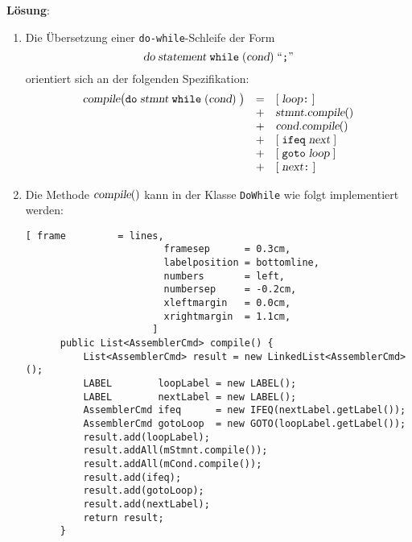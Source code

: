 \documentclass{article}
\newcommand{\solution}{
\vspace*{0.3cm}

\noindent
\textbf{L\"osung}: }
\newcommand{\quoted}[1]{\mbox{``\texttt{#1}''}}
\begin{document}
\solution
\begin{enumerate}
\item Die \"Ubersetzung einer \texttt{do-while}-Schleife der Form
      \[ \textsl{do}\; \textsl{statement}\; \texttt{while}\;(\textsl{cond})\; \quoted{;} \]
      orientiert sich an der folgenden Spezifikation:
      \[
      \begin{array}[t]{lcl}
        \textsl{compile}\bigl(\mathtt{do}\; \textsl{stmnt}\; \texttt{while}\; (\textsl{cond})\;\bigr) 
        & = & 
        [\;\textsl{loop}\texttt{:}\;]            \\
        & + & \textsl{stmnt}.\textsl{compile}()    \\    
        & + & \textsl{cond}.\textsl{compile}()         \\
        & + & [\;\texttt{ifeq}\;\textsl{next}\;] \\
        & + & [\;\texttt{goto}\;\textsl{loop}\;]    \\    
        & + & [\;\textsl{next}\texttt{:}\;]         
      \end{array}
      \]
\item Die Methode $\textsl{compile}()$ kann in der Klasse \texttt{DoWhile} wie folgt implementiert werden:
      \begin{Verbatim}[ frame         = lines, 
                        framesep      = 0.3cm, 
                        labelposition = bottomline,
                        numbers       = left,
                        numbersep     = -0.2cm,
                        xleftmargin   = 0.0cm,
                        xrightmargin  = 1.1cm,
                      ]
      public List<AssemblerCmd> compile() {
          List<AssemblerCmd> result = new LinkedList<AssemblerCmd>();
          LABEL        loopLabel = new LABEL();
          LABEL        nextLabel = new LABEL();
          AssemblerCmd ifeq      = new IFEQ(nextLabel.getLabel());
          AssemblerCmd gotoLoop  = new GOTO(loopLabel.getLabel());
          result.add(loopLabel);
          result.addAll(mStmnt.compile());
          result.addAll(mCond.compile());
          result.add(ifeq);
          result.add(gotoLoop);
          result.add(nextLabel);
          return result;
      }
      \end{Verbatim}
\end{enumerate}
\end{document}
